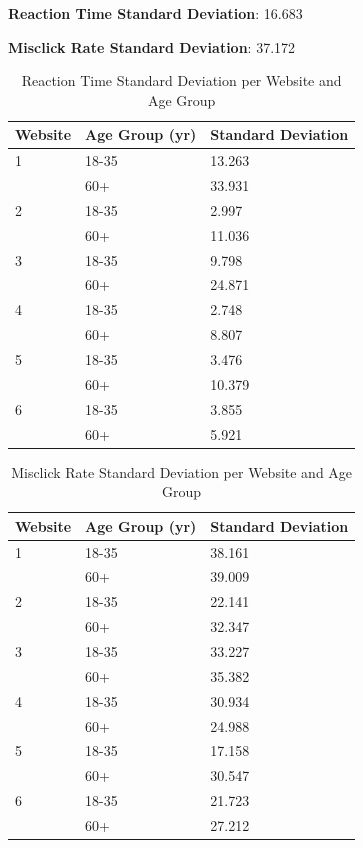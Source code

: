 \documentclass[12pt,twoside]{reedthesis}
\begin{document}
\textbf{Reaction Time Standard Deviation}: 16.683

\textbf{Misclick Rate Standard Deviation}: 37.172

\begin{table}[h!]
    \centering
    \begin{tabular}{| p{5cm} | p{3.5cm} | p{3.5cm} |}
        \hline
        Website & Age Group (yr) & Standard Deviation\\
        \hline
        1 & 18-35 & 13.263\\
        \hline
        & 60+ & 33.931\\
        \hline
        2 & 18-35 & 2.997\\
        \hline
        & 60+ & 11.036\\
        \hline
        3 & 18-35 & 9.798\\
        \hline
        & 60+ & 24.871\\
        \hline
        4 & 18-35 & 2.748\\
        \hline
        & 60+ & 8.807\\
        \hline
        5 & 18-35 & 3.476\\
        \hline
        & 60+ & 10.379\\
        \hline
        6 & 18-35 & 3.855\\
        \hline
        & 60+ & 5.921\\
        \hline
    \end{tabular}
    \caption{Reaction Time Standard Deviation per Website and Age Group}
\end{table}

\begin{table}[h!]
    \centering
    \begin{tabular}{| p{5cm} | p{3.5cm} | p{3.5cm} |}
        \hline
        Website & Age Group (yr) & Standard Deviation\\
        \hline
        1 & 18-35 & 38.161\\
        \hline
        & 60+ & 39.009\\
        \hline
        2 & 18-35 & 22.141\\
        \hline
        & 60+ & 32.347\\
        \hline
        3 & 18-35 & 33.227\\
        \hline
        & 60+ & 35.382\\
        \hline
        4 & 18-35 & 30.934\\
        \hline
        & 60+ & 24.988\\
        \hline
        5 & 18-35 & 17.158\\
        \hline
        & 60+ & 30.547\\
        \hline
        6 & 18-35 & 21.723\\
        \hline
        & 60+ & 27.212\\
        \hline
    \end{tabular}
    \caption{Misclick Rate Standard Deviation per Website and Age Group}
\end{table}
\end{document}
